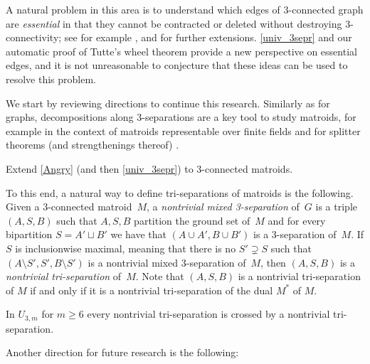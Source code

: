 \documentclass{aic}
\theoremstyle{plain}
\theoremstyle{definition}
\theoremstyle{plain}
\theoremstyle{plain}
\newcommand{\sm}{\setminus}
\renewcommand{\geq}{\geqslant}
\begin{document}
A natural problem in this area is to understand which edges of 3-connected graph are \emph{essential} in that they cannot be contracted or deleted without destroying 3-connectivity; see for example \cite{ando1987contractible}, and \cite{kriesell2008number} for further extensions. \autoref{univ_3sepr} and our automatic proof of Tutte's wheel theorem provide a new perspective on essential edges, and it is not unreasonable to conjecture that these ideas can be used to resolve this problem.


\clearpage
\renewcommand{\thechapter}{3}
\noindent{\huge{\textbf{Chapter \thechapter \\ \\Outlook}}}\label{sec:conc}
\addcontentsline{toc}{section}{\thechapter\ Outlook}\bigskip\bigskip

\setcounter{section}{1}

We start by reviewing directions to continue this research. Similarly as for graphs, decompositions along 3-separations are a key tool to study matroids, for example in the context of matroids representable over finite fields  \cite{geelen2013inequivalent} and for splitter theorems (and strengthenings thereof) \cite{brettell2014splitter,Splitter4conMatroids,Matroids3conSplitter}. 

\begin{oprob}
Extend \autoref{Angry} (and then \autoref{univ_3sepr}) to 3-connected matroids. 
\end{oprob}

To this end, a natural way to define tri-separations of matroids is the following.
Given a 3-connected matroid~$M$, a \emph{nontrivial mixed 3-separation} of~$G$ is a triple $(A,S,B)$ such that $A,S,B$ partition the ground set of~$M$ and for every bipartition $S=A'\sqcup B'$ we have that $(A\cup A',B\cup B')$ is a 3-separation of~$M$.
If $S$ is inclusionwise maximal, meaning that there is no $S'\supsetneq S$ such that $(A\sm S',S',B\sm S')$ is a nontrivial mixed 3-separation of~$M$, then $(A,S,B)$ is a \emph{nontrivial tri-separation} of~$M$.
Note that $(A,S,B)$ is a nontrivial tri-separation of $M$ if and only if it is a nontrivial tri-separation of the dual $M^*$ of $M$.

\begin{eg}
    In $U_{3,m}$ for $m\geq 6$ every nontrivial tri-separation is crossed by a {nontrivial} tri-separation.
\end{eg}

Another direction for future research is the following:
\end{document}
